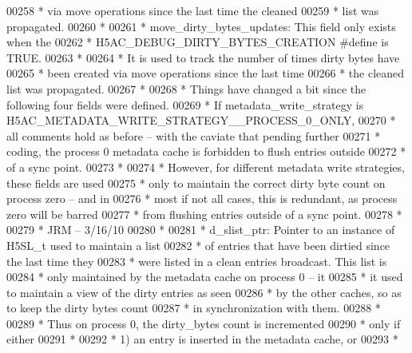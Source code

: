 \begin{DoxyCode}
00258 \textcolor{comment}{ *      via move operations since the last time the cleaned}
00259 \textcolor{comment}{ *      list was propagated.}
00260 \textcolor{comment}{ *}
00261 \textcolor{comment}{ * move\_dirty\_bytes\_updates:  This field only exists when the}
00262 \textcolor{comment}{ *              H5AC\_DEBUG\_DIRTY\_BYTES\_CREATION #define is TRUE.}
00263 \textcolor{comment}{ *}
00264 \textcolor{comment}{ *      It is used to track the number of times dirty bytes have}
00265 \textcolor{comment}{ *      been created via move operations since the last time}
00266 \textcolor{comment}{ *      the cleaned list was propagated.}
00267 \textcolor{comment}{ *}
00268 \textcolor{comment}{ * Things have changed a bit since the following four fields were defined.}
00269 \textcolor{comment}{ * If metadata\_write\_strategy is H5AC\_METADATA\_WRITE\_STRATEGY\_\_PROCESS\_0\_ONLY,}
00270 \textcolor{comment}{ * all comments hold as before -- with the caviate that pending further }
00271 \textcolor{comment}{ * coding, the process 0 metadata cache is forbidden to flush entries outside}
00272 \textcolor{comment}{ * of a sync point.}
00273 \textcolor{comment}{ *}
00274 \textcolor{comment}{ * However, for different metadata write strategies, these fields are used}
00275 \textcolor{comment}{ * only to maintain the correct dirty byte count on process zero -- and in}
00276 \textcolor{comment}{ * most if not all cases, this is redundant, as process zero will be barred}
00277 \textcolor{comment}{ * from flushing entries outside of a sync point.}
00278 \textcolor{comment}{ *}
00279 \textcolor{comment}{ *                      JRM -- 3/16/10}
00280 \textcolor{comment}{ *}
00281 \textcolor{comment}{ * d\_slist\_ptr:  Pointer to an instance of H5SL\_t used to maintain a list}
00282 \textcolor{comment}{ *      of entries that have been dirtied since the last time they}
00283 \textcolor{comment}{ *      were listed in a clean entries broadcast.  This list is}
00284 \textcolor{comment}{ *      only maintained by the metadata cache on process 0 -- it}
00285 \textcolor{comment}{ *      it used to maintain a view of the dirty entries as seen}
00286 \textcolor{comment}{ *      by the other caches, so as to keep the dirty bytes count}
00287 \textcolor{comment}{ *      in synchronization with them.}
00288 \textcolor{comment}{ *}
00289 \textcolor{comment}{ *      Thus on process 0, the dirty\_bytes count is incremented}
00290 \textcolor{comment}{ *      only if either}
00291 \textcolor{comment}{ *}
00292 \textcolor{comment}{ *      1) an entry is inserted in the metadata cache, or}
00293 \textcolor{comment}{ *}

\end{DoxyCode}
